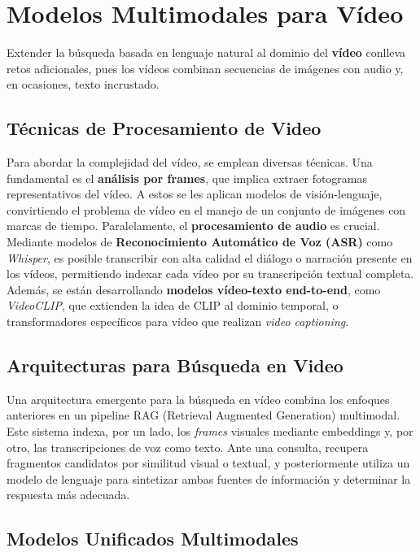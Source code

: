 \section{Modelos Multimodales para Vídeo}

Extender la búsqueda basada en lenguaje natural al dominio del \textbf{vídeo} conlleva retos adicionales, pues los vídeos combinan secuencias de imágenes con audio y, en ocasiones, texto incrustado.

\subsection{Técnicas de Procesamiento de Video}

Para abordar la complejidad del vídeo, se emplean diversas técnicas. Una fundamental es el \textbf{análisis por frames}, que implica extraer fotogramas representativos del vídeo. A estos se les aplican modelos de visión-lenguaje, convirtiendo el problema de vídeo en el manejo de un conjunto de imágenes con marcas de tiempo. Paralelamente, el \textbf{procesamiento de audio} es crucial. Mediante modelos de \textbf{Reconocimiento Automático de Voz (ASR)} como \emph{Whisper}, es posible transcribir con alta calidad el diálogo o narración presente en los vídeos, permitiendo indexar cada vídeo por su transcripción textual completa. Además, se están desarrollando \textbf{modelos vídeo-texto end-to-end}, como \emph{VideoCLIP}, que extienden la idea de CLIP al dominio temporal, o transformadores específicos para vídeo que realizan \emph{video captioning}.

\subsection{Arquitecturas para Búsqueda en Video}

Una arquitectura emergente para la búsqueda en vídeo combina los enfoques anteriores en un pipeline RAG (Retrieval Augmented Generation) multimodal. Este sistema indexa, por un lado, los \emph{frames} visuales mediante embeddings y, por otro, las transcripciones de voz como texto. Ante una consulta, recupera fragmentos candidatos por similitud visual o textual, y posteriormente utiliza un modelo de lenguaje para sintetizar ambas fuentes de información y determinar la respuesta más adecuada.

\subsection{Modelos Unificados Multimodales}

